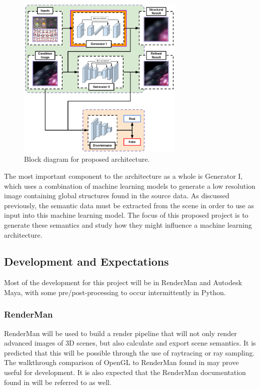 \documentclass[conference]{IEEEtran}
\begin{document}
\begin{figure}[htbp]
\centerline{\includegraphics[width=8cm]{block_diagram.png}}
\caption{Block diagram for proposed architecture.}
\label{fig:block_diagram}
\end{figure}

The most important component to the architecture as a whole
is Generator I, which uses a combination of machine learning models to generate a
low resolution image containing global structures found in the
source data. As discussed previously, the semantic data must be extracted from
the scene in order to use as input into this machine learning model.
The focus of this proposed project is to generate these semantics and study
how they might influence a machine learning architecture.

\subsection{Development and Expectations}
Most of the development for this project will be in RenderMan and Autodesk Maya,
with some pre/post-processing to occur intermittently in Python.

\subsubsection{RenderMan}
RenderMan will be used to build a render pipeline that will not only render advanced images
of 3D scenes, but also calculate and export scene semantics.
It is predicted that this will be possible through the use of raytracing or ray sampling.
The walkthrough comparison of OpenGL to RenderMan found in \cite{renderman_opengl}
may prove useful for development.
It is also expected that the RenderMan documentation found in \cite{renderman_docs}
will be referred to as well.
\end{document}
